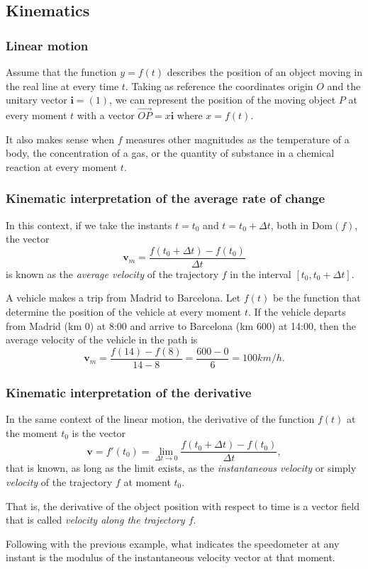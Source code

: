 \subsection{Kinematics}
\begin{frame}
\frametitle{Linear motion}
Assume that the function $y=f(t)$ describes the position of an object moving in the real line at every time $t$.
Taking as reference the coordinates origin $O$ and the unitary vector $\mathbf{i}=(1)$, we can represent the position of the moving object $P$ at every moment $t$ with a vector $\vec{OP}=x\mathbf{i}$ where $x=f(t)$.
\begin{center}

\end{center}

 It also makes sense when $f$ measures other magnitudes as the temperature of a body, the concentration of a gas, or the quantity of substance in a chemical reaction at every moment $t$.
\end{frame}


\begin{frame}
\frametitle{Kinematic interpretation of the average rate of change}
In this context, if we take the instants $t=t_0$ and $t=t_0+\Delta t$, both in $\mbox{Dom}(f)$, the vector
\[
\mathbf{v}_m=\frac{f(t_0+\Delta t)-f(t_0)}{\Delta t}
\]
is known as the \emph{average velocity} of the trajectory $f$ in the interval $[t_0, t_0+\Delta t]$.

A vehicle makes a trip from Madrid to Barcelona.
Let $f(t)$ be the function that determine the position of the vehicle at every moment $t$.
If the vehicle departs from Madrid (km 0) at 8:00 and arrive to Barcelona (km 600) at 14:00, then the average velocity
of the vehicle in the path is
\[
\mathbf{v}_m=\frac{f(14)-f(8)}{14-8}=\frac{600-0}{6} = 100 km/h.
\]
\end{frame}


\begin{frame}
\frametitle{Kinematic interpretation of the derivative}
In the same context of the linear motion, the derivative of the function $f(t)$ at the moment $t_0$ is the vector
\[
\mathbf{v}=f'(t_0)=\lim_{\Delta t\rightarrow 0}\frac{f(t_0+\Delta t)-f(t_0)}{\Delta t},
\]
that is known, as long as the limit exists, as the \emph{instantaneous velocity} or simply \emph{velocity} of the trajectory $f$ at moment $t_0$.

That is, the derivative of the object position with respect to time is a vector field that is called \emph{velocity along the trajectory $f$}.

Following with the previous example, what indicates the speedometer at any instant is the modulus of the instantaneous velocity vector at that moment.
\end{frame}


